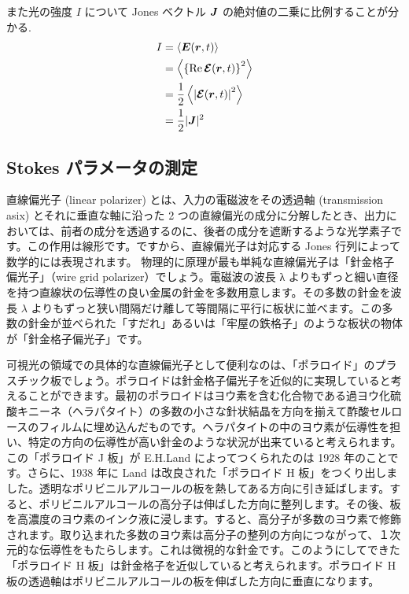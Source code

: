 \documentclass[uplatex,dvipdfmx,a4paper,11pt]{jlreq}
\newcommand{\EE}{\bm{E}}
\newcommand{\rr}{\bm{r}}
\theoremstyle{definition}
\begin{document}
また光の強度 $I$ について Jones ベクトル $\bm{J}$ の絶対値の二乗に比例することが分かる.
\begin{align}
  I & = \left\langle\EE(\rr, t)\right\rangle                   \\
    & = \left\langle\qty{\Re\EC(\rr,t)}^2\right\rangle         \\
    & = \frac{1}{2}\left\langle\qty|\EC(\rr,t)|^2\right\rangle \\
    & = \frac{1}{2}|\JJ|^2 \label{Jones strength}
\end{align}

\subsection{Stokes パラメータの測定}
\begin{definition}[光学素子]
  直線偏光子 (linear polarizer) とは、入力の電磁波をその透過軸 (transmission asix) とそれに垂直な軸に沿った 2 つの直線偏光の成分に分解したとき、出力においては、前者の成分を透過するのに、後者の成分を遮断するような光学素子です。この作用は線形です。ですから、直線偏光子は対応する Jones 行列によって数学的には表現されます。
  物理的に原理が最も単純な直線偏光子は「針金格子偏光子」（wire grid polarizer）でしょう。電磁波の波長 λ よりもずっと細い直径を持つ直線状の伝導性の良い金属の針金を多数用意します。その多数の針金を波長 $\lambda$ よりもずっと狭い間隔だけ離して等間隔に平行に板状に並べます。この多数の針金が並べられた「すだれ」あるいは「牢屋の鉄格子」のような板状の物体が「針金格子偏光子」です。
\end{definition}

可視光の領域での具体的な直線偏光子として便利なのは、「ポラロイド」のプラスチック板でしょう。ポラロイドは針金格子偏光子を近似的に実現していると考えることができます。最初のポラロイドはヨウ素を含む化合物である過ヨウ化硫酸キニーネ（ヘラパタイト）の多数の小さな針状結晶を方向を揃えて酢酸セルロースのフィルムに埋め込んだものです。ヘラパタイトの中のヨウ素が伝導性を担い、特定の方向の伝導性が高い針金のような状況が出来ていると考えられます。この「ポラロイド J 板」が E.H.Land によってつくられたのは 1928 年のことです。さらに、1938 年に Land は改良された「ポラロイド H 板」をつくり出しました。透明なポリビニルアルコールの板を熱してある方向に引き延ばします。すると、ポリビニルアルコールの高分子は伸ばした方向に整列します。その後、板を高濃度のヨウ素のインク液に浸します。すると、高分子が多数のヨウ素で修飾されます。取り込まれた多数のヨウ素は高分子の整列の方向につながって、１次元的な伝導性をもたらします。これは微視的な針金です。このようにしてできた「ポラロイド H 板」は針金格子を近似していると考えられます。ポラロイド H 板の透過軸はポリビニルアルコールの板を伸ばした方向に垂直になります。
\end{document}
